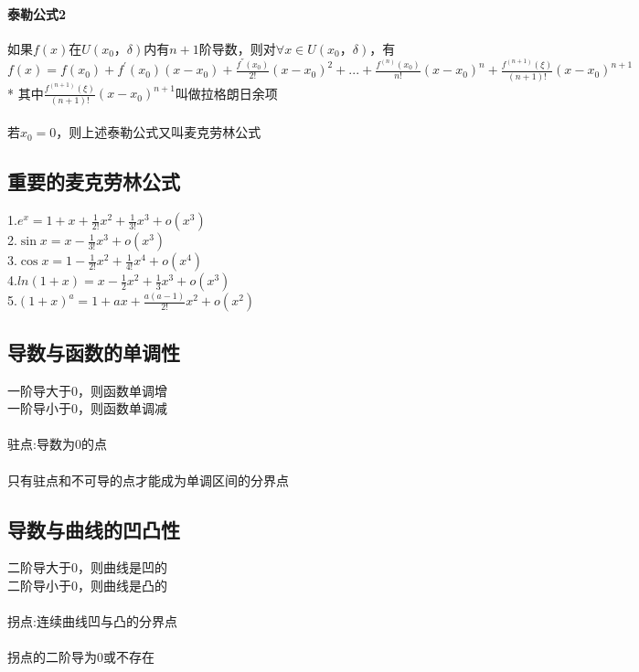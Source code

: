\documentclass{article}
\begin{document}
\begin{flushleft}
	\paragraph{泰勒公式2}
	如果$f(x)$在$U(x_0，\delta)$内有$n+1$阶导数，则对$\forall x \in U(x_0，\delta)$，有$f(x)=f(x_0)+f^{'}(x_0)(x-x_0)+\frac{f^{''}(x_0)}{2!}(x-x_0)^2+...+\frac{f^{(n)}(x_0)}{n!}(x-x_0)^n+\frac{f^{(n+1)}(\xi)}{(n+1)!}(x-x_0)^{n+1}$\\
	* 其中$\frac{f^{(n+1)}(\xi)}{(n+1)!}(x-x_0)^{n+1}$叫做拉格朗日余项\\
	~\\
	若$x_0=0$，则上述泰勒公式又叫麦克劳林公式\\
	
	\subsection{重要的麦克劳林公式}
	
	1.$e^x=1+x+\frac{1}{2!}x^2+\frac{1}{3!}x^3+o(x^3)$\\
	2.$\sin x=x-\frac{1}{3!}x^3+o(x^3)$\\
	3.$\cos x=1-\frac{1}{2!}x^2+\frac{1}{4!}x^4+o(x^4)$\\
	4.$ln(1+x)=x-\frac{1}{2}x^2+\frac{1}{3}x^3+o(x^3)$\\
	5.$(1+x)^a=1+ax+\frac{a(a-1)}{2!}x^2+o(x^2)$\\
	
	\subsection{导数与函数的单调性}
	
	一阶导大于0，则函数单调增\\
	一阶导小于0，则函数单调减\\
	~\\
	驻点:导数为0的点\\
	~\\
	只有驻点和不可导的点才能成为单调区间的分界点\\
	
	\subsection{导数与曲线的凹凸性}
	
	二阶导大于0，则曲线是凹的\\
	二阶导小于0，则曲线是凸的\\
	~\\
	拐点:连续曲线凹与凸的分界点\\
	~\\
	拐点的二阶导为0或不存在\\
	~\\

\end{flushleft}
\end{document}
